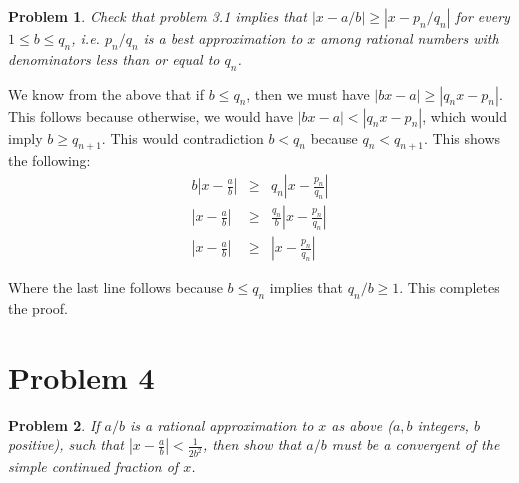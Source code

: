 \documentclass[psamsfonts]{amsart}
\newtheorem{prob}{Problem}[section]
\newenvironment{sol}{{\bfseries Solution}}{\qedsymbol}
\theoremstyle{definition}
\theoremstyle{remark}
\numberwithin{equation}{section}
\begin{document}
\begin{prob}
Check that problem 3.1 implies that $|x - a/b| \geq |x - p_n/q_n|$ for every $1 \leq b \leq q_n$, i.e. $p_n/q_n$ is a best approximation to $x$ among rational numbers with denominators less than or equal to $q_n$. 
\end{prob}

\begin{sol}
We know from the above that if $b \leq q_n$, then we must have $|bx - a| \geq |q_n x - p_n|$. This follows because otherwise, we would have $|bx - a| < |q_n x - p_n|$, which would imply $b \geq q_{n+1}$. This would contradiction $b < q_n$ because $q_n < q_{n+1}$. This shows the following:
\begin{eqnarray}
b \left| x - \frac{a}{b} \right| &\geq& q_n \left| x - \frac{p_n}{q_n} \right| \\
\left| x - \frac{a}{b} \right| &\geq& \frac{q_n}{b} \left| x - \frac{p_n}{q_n} \right| \\
\left| x - \frac{a}{b} \right| &\geq& \left| x - \frac{p_n}{q_n} \right|
\end{eqnarray}

Where the last line follows because $b \leq q_n$ implies that $q_n/b \geq 1$. This completes the proof. 
\end{sol}

\section{Problem 4}

\begin{prob}
If $a/b$ is a rational approximation to $x$ as above ($a,b$ integers, $b$ positive), such that $|x - \frac{a}{b}| < \frac{1}{2b^2}$, then show that $a/b$ must be a convergent of the simple continued fraction of $x$. 
\end{prob}
\end{document}
